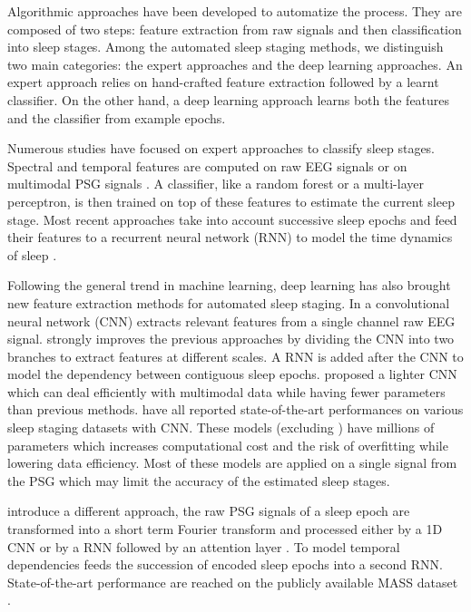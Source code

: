\documentclass[journal]{IEEEtran}
\begin{document}
Algorithmic approaches have been developed to automatize the process. They are composed of two steps: feature extraction from raw signals and then classification into sleep stages. Among the automated sleep staging methods, we distinguish two main categories: the expert approaches and the deep learning approaches. An expert approach relies on hand-crafted feature extraction followed by a learnt classifier. On the other hand, a deep learning approach learns both the features and the classifier from example epochs.

Numerous studies have focused on expert approaches to classify sleep stages. Spectral and temporal features are computed on raw EEG signals \cite{kerkeni:inria-00112586}  \cite{Berthomier2007} or on multimodal PSG signals \cite{Lajnef2015}. A classifier, like a random forest or a multi-layer perceptron, is then trained on top of these features to estimate the current sleep stage. Most recent approaches take into account successive sleep epochs and feed their features to a recurrent neural network (RNN) to model the time dynamics of sleep \cite{Dong2018}. 

Following the general trend in machine learning, deep learning has also brought new feature extraction methods for automated sleep staging. In \cite{Tsinalis2016a} a convolutional neural network (CNN) extracts relevant features from a single channel raw EEG signal. \cite{Supratak2017} strongly improves the previous approaches by dividing the CNN into two branches to extract features at different scales. A RNN is added after the CNN to model the dependency between contiguous sleep epochs. \cite{Chambon2018} proposed a lighter CNN which can deal efficiently with multimodal data while having fewer parameters than previous methods. \cite{Sors2018} \cite{Cui2018} \cite{Vilamala2017} \cite{Biswal2018} \cite{Fernandez-Varela}  \cite{Stephansen2018} have all reported state-of-the-art performances on various sleep staging datasets with CNN.
These models (excluding \cite{Chambon2018}) have millions of parameters which increases computational cost and the risk of overfitting while lowering data efficiency. Most of these models are applied on a single signal from the PSG which may limit the accuracy of the estimated sleep stages.

\cite{Phan2019} \cite{Phan2018c} \cite{Phan2018b} introduce a different approach, the raw PSG signals of a sleep epoch are transformed into a short term Fourier transform and processed either by a 1D CNN or by a RNN followed by an attention layer \cite{Luong2015}. To model temporal dependencies \cite{Phan2019} feeds the succession of encoded sleep epochs into a second RNN. State-of-the-art performance are reached on the publicly available MASS dataset \cite{OReilly2014}.
\end{document}
